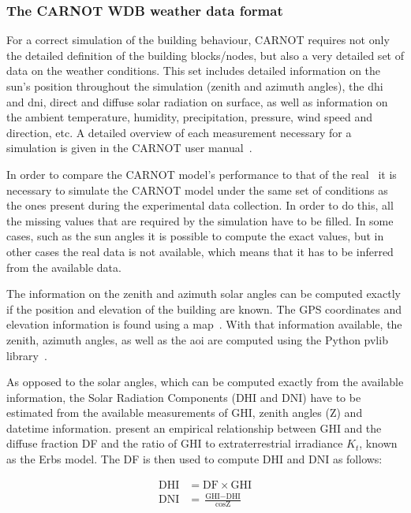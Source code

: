 \subsubsection{The CARNOT WDB weather data format}\label{sec:CARNOT_WDB}

For a correct simulation of the building behaviour, CARNOT requires not only the
detailed definition of the building blocks/nodes, but also a very detailed set
of data on the weather conditions. This set includes detailed information on the
sun's position throughout the simulation (zenith and azimuth angles), the
\acrfull{dhi} and \acrfull{dni}, direct and diffuse solar radiation on surface,
as well as information on the ambient temperature, humidity, precipitation,
pressure, wind speed and direction, etc.  A detailed overview of each
measurement necessary for a simulation is given in the CARNOT user
manual~\cite{CARNOTManual}.

In order to compare the CARNOT model's performance to that of the real \pdome\,
it is necessary to simulate the CARNOT model under the same set of conditions as
the ones present during the experimental data collection. In order to do this,
all the missing values that are required by the simulation have to be filled. In
some cases, such as the sun angles it is possible to compute the exact values,
but in other cases the real data is not available, which means that it has to be
inferred from the available data.

The information on the zenith and azimuth solar angles can be computed exactly
if the position and elevation of the building are known. The GPS coordinates and
elevation information is found using a map~\cite{ElevationFinder}. With that
information available, the zenith, azimuth angles, as well as the \acrfull{aoi}
are computed using the Python pvlib
library~\cite{f.holmgrenPvlibPythonPython2018}.

As opposed to the solar angles, which can be computed exactly from the available
information, the Solar Radiation Components (DHI and DNI) have to be estimated
from the available measurements of GHI, zenith angles (Z) and datetime
information.  \textcite{erbsEstimationDiffuseRadiation1982} present an empirical
relationship between GHI and the diffuse fraction DF and the ratio of GHI to
extraterrestrial irradiance $K_t$, known as the Erbs model. The DF is then used
to compute DHI and DNI as follows:

\begin{equation}
    \begin{aligned}
        \text{DHI} &= \text{DF} \times \text{GHI} \\
        \text{DNI} &= \frac{\text{GHI} - \text{DHI}}{\cos{\text{Z}}}
    \end{aligned}
\end{equation}


